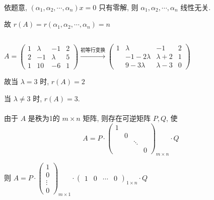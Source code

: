	 \paragraph{} %
		 依题意, \( (\alpha_{1}, \alpha_{2}, \cdots, \alpha_{n})x = 0 \) 只有零解, 则 \( \alpha_{1}, \alpha_{2}, \cdots, \alpha_{n} \) 线性无关.

		 故 \( r(A) = r(\alpha_{1}, \alpha_{2}, \cdots, \alpha_{n}) = n \)


 \subsection{} %


	 \paragraph{} %
		 \( A = \begin{pmatrix}
			 1 & \lambda & -1      & 2 \\
			 2 & -1      & \lambda & 5 \\
			 1 & 10      & -6      & 1
		 \end{pmatrix} \xrightarrow{\text{初等行变换}} \begin{pmatrix}
			 1 & \lambda     & -1        & 2 \\
			   & -1-2\lambda & \lambda+2 & 1 \\
			   & 9-3\lambda  & \lambda-3 & 0
		 \end{pmatrix} \)

		 故当 \( \lambda = 3 \) 时, \( r(A) = 2 \)

		 当 \( \lambda \neq 3 \) 时, \( r(A) = 3 \).


	 \paragraph{} %
		 由于 \( A \) 是秩为1的 \( m \times n \) 矩阵, 则存在可逆矩阵 \( P, Q \), 使
		 \[ A = P \cdot \begin{pmatrix}
				 1                 \\
				  & 0              \\
				  &   & \ddots     \\
				  &   &        & 0
			 \end{pmatrix}_{m \times n}\cdot  Q \]

		 则 \( A = P \cdot \begin{pmatrix}
			 1      \\
			 0      \\
			 \vdots \\
			 0
		 \end{pmatrix}_{m \times 1} \cdot \begin{pmatrix}
			 1 & 0 & \cdots & 0
		 \end{pmatrix}_{1 \times n} \cdot Q \)

